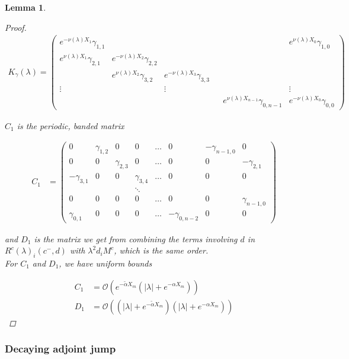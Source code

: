 \documentclass[12pt]{article}
\newtheorem{lemma}{Lemma}
\begin{document}
\begin{lemma}
\begin{proof}
\begin{align*}
K_\gamma(\lambda) =  
\begin{pmatrix}
e^{-\nu(\lambda)X_1} \gamma_{1,1} & & & & & e^{\nu(\lambda)X_0}\gamma_{1,0} \\
e^{\nu(\lambda)X_1}\gamma_{2,1} & e^{-\nu(\lambda)X_2}\gamma_{2,2} \\
& e^{\nu(\lambda)X_2}\gamma_{3,2} & e^{-\nu(\lambda)X_3}\gamma_{3,3} \\
\vdots & & \vdots & &&  \vdots \\
& & & & e^{\nu(\lambda)X_{n-1}}\gamma_{0,n-1} & e^{-\nu(\lambda)X_0}\gamma_{0,0} 
\end{pmatrix}
\end{align*}

$C_1$ is the periodic, banded matrix

\begin{align*}
C_1 &= \begin{pmatrix}
0 & \gamma_{1,2} & 0 & 0 & \dots & 0 & -\gamma_{n-1,0} & 0 \\
0 & 0 & \gamma_{2,3} & 0 & \dots & 0 & 0 & -\gamma_{2,1} \\
-\gamma_{3,1} & 0 & 0 & \gamma_{3,4} & \dots & 0 & 0 & 0 \\
&  & & \ddots  \\
0 & 0 & 0 & 0 & \dots & 0 & 0 & \gamma_{n-1,0} \\
\gamma_{0,1} & 0 & 0 & 0 & \dots & -\gamma_{0, n-2} & 0 & 0 
\end{pmatrix}
\end{align*}

and $D_1$ is the matrix we get from combining the terms involving $d$ in $R^c(\lambda)_i(c^-, d)$ with $\lambda^2 d_i M^c$, which is the same order.\\

For $C_1$ and $D_1$, we have uniform bounds

\begin{align*}
C_1 &= \mathcal{O}(e^{-\tilde{\alpha} X_m}(|\lambda| + e^{-\alpha X_m})) \\
D_1 &= \mathcal{O}((|\lambda| + e^{-\tilde{\alpha} X_m})(|\lambda| + e^{-\alpha X_m}))
\end{align*}

\end{proof}
\end{lemma}

\subsubsection{Decaying adjoint jump}
\end{document}
